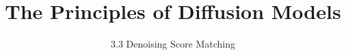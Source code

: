 ﻿%

\graphicspath{{../images/}}
\title{The Principles of Diffusion Models}
\subtitle{3.3 Denoising Score Matching}


\begin{frame}
    \titlepage
\end{frame}


